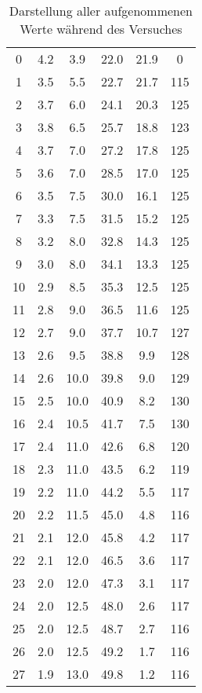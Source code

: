 \begin{table}
    \centering
    \begin{tabular}{S[table-format=2.0] S[table-format=1.1] S[table-format=2.1] S[table-format=2.1] S[table-format=2.1] S[table-format=3.0]}
        \toprule
     &  &  &  &  &  \\
         & 4.2 & 3.9 & 22.0 & 21.9 & 0 \\
        1 & 3.5 & 5.5 & 22.7 & 21.7 & 115 \\
        2 & 3.7 & 6.0 & 24.1 & 20.3 & 125 \\
        3 & 3.8 & 6.5 & 25.7 & 18.8 & 123 \\
        4 & 3.7 & 7.0 & 27.2 & 17.8 & 125\\
        5 & 3.6 & 7.0 & 28.5 & 17.0 & 125\\
        6 & 3.5 & 7.5 & 30.0 & 16.1 & 125\\
        7 & 3.3 & 7.5 & 31.5 & 15.2 & 125\\
        8 & 3.2 & 8.0 & 32.8 & 14.3 & 125\\
        9 & 3.0 & 8.0 & 34.1 & 13.3 & 125\\
        10 & 2.9 & 8.5 & 35.3 & 12.5 & 125\\
        11 & 2.8 & 9.0 & 36.5 & 11.6 & 125\\
        12 & 2.7 & 9.0 & 37.7 & 10.7 & 127\\
        13 & 2.6 & 9.5 & 38.8 & 9.9 & 128\\
        14 & 2.6 & 10.0 & 39.8 & 9.0 & 129\\
        15 & 2.5 & 10.0 & 40.9 & 8.2 & 130\\
        16 & 2.4 & 10.5 & 41.7 & 7.5 & 130\\
        17 & 2.4 & 11.0 & 42.6 & 6.8 & 120\\
        18 & 2.3 & 11.0 & 43.5 & 6.2 & 119\\
        19 & 2.2 & 11.0 & 44.2 & 5.5 & 117\\
        20 & 2.2 & 11.5 & 45.0 & 4.8 & 116\\
        21 & 2.1 & 12.0 & 45.8 & 4.2 & 117\\
        22 & 2.1 & 12.0 & 46.5 & 3.6 & 117\\
        23 & 2.0 & 12.0 & 47.3 & 3.1 & 117\\
        24 & 2.0 & 12.5 & 48.0 & 2.6 & 117\\
        25 & 2.0 & 12.5 & 48.7 & 2.7 & 116\\
        26 & 2.0 & 12.5 & 49.2 & 1.7 & 116\\
        27 & 1.9 & 13.0 & 49.8 & 1.2 & 116\\
            \bottomrule
    \end{tabular}
    \caption{Darstellung aller aufgenommenen Werte während des Versuches}
    \label{tab:werte}
\end{table}

